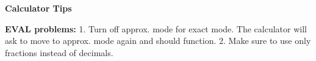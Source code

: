 \documentclass[9pt]{article}
\begin{document}
    \noindent\textbf{Calculator Tips}
        \begin{multicols}{2}
            \noindent\textbf{EVAL problems:} 1. Turn off approx. mode for exact mode. The calculator will ask to move to approx. mode again and should function. 2. Make sure to use only fractions instead of decimals.
        \end{multicols}
\end{document}
